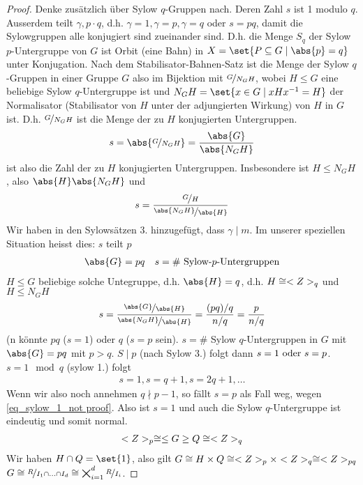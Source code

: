\begin{proof}
	Denke zusätzlich über Sylow $q$-Gruppen nach. Deren Zahl $s$ ist 1 modulo $q$. Ausserdem teilt $\gamma, p\cdot q$, d.h. $\gamma = 1, \gamma = p, \gamma = q$ oder $s = pq$, damit die Sylowgruppen alle konjugiert sind zueinander sind. D.h. die Menge $S_q$ der Sylow $p$-Untergruppe von $G$ ist Orbit (eine Bahn) in $X = \set{P \subseteq G \mid \abs{p} = q}$ unter Konjugation. Nach dem Stabilisator-Bahnen-Satz ist die Menge der Sylow $q$-Gruppen in einer Gruppe $G$ also im Bijektion mit $\lnkset{G}{N_G H}$, wobei $H \le G$ eine beliebige Sylow $q$-Untergruppe ist und $N_G H = \set{x \in G \mid x H x^{-1} = H}$ der Normalisator (Stabilisator von $H$ unter der adjungierten Wirkung) von $H$ in $G$ ist. D.h. $\lnkset{G}{N_G H}$ ist die Menge der zu $H$ konjugierten Untergruppen.
	\begin{align*}
		s = \abs{\lnkset{G}{N_G H}} = \frac{\abs{G}}{\abs{N_G H}}
	\end{align*}
	ist also die Zahl der zu $H$ konjugierten Untergruppen. Insbesondere ist $H \le N_G H$, also $\abs{H}\abs{N_G H}$ und 
	\begin{align*}
		s = \frac{\lnkset{G}{H}}{\lnkset{\abs{N_G H}}{\abs{H}}}
	\end{align*}
	Wir haben in den Sylowsätzen 3. hinzugefügt, dass $\gamma \mid m$. Im unserer speziellen Situation heisst dies: $s$ teilt $p$
	\begin{align*}
		\abs{G} = pq \quad s = \#\text{ Sylow-}p\text{-Untergruppen}
	\end{align*}
	$H \le G$ beliebige solche Untegruppe, d.h. $\abs{H} = q$, d.h. $H \cong <Z>_q$ und $H \le N_G H$
	\begin{align*}
		s = \frac{\lnkset{\abs{G}}{\abs{H}}}{\lnkset{\abs{N_G H}}{\abs{H}}} = \frac{(pq)/q}{n/q} = \frac{p}{n/q}
	\end{align*}
	(n könnte $pq$ ($s=1$) oder $q$ ($s=p$ sein). $s = \#$ Sylow $q$-Untergruppen in $G$ mit $\abs{G} = pq$ mit $p>q$. $S \mid p$ (nach Sylow 3.) folgt dann $s =1 \text{ oder } s =p$. $s = 1 \mod q$ (sylow 1.) folgt
	\begin{align*}
		s=1,s=q+1, s= 2q+1, \dots \tag{$\ast$}\label{eq_sylow_1_not proof}
	\end{align*}
	Wenn wir also noch annehmen $q \nmid p -1$, so fällt $s = p$ als Fall weg, wegen \eqref{eq_sylow_1_not proof}. Also ist $s =1$ und auch die Sylow $q$-Untergruppe ist eindeutig und somit normal.
	\begin{align*}
		<Z>_p \cong \le G \ge Q \cong <Z>_q
	\end{align*}
	Wir haben $H \cap Q = \set{1}$, also gilt $G \cong H \times Q \cong <Z>_p \times <Z>_q \cong <Z>_{pq}$ $G \cong \lnkset{R}{I_1 \cap ... \cap I_d} \cong \bigtimes_{i=1}^d\lnkset{R}{I_i}$.
\end{proof}
